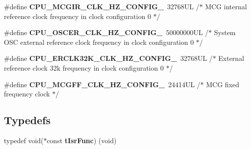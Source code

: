 \begin{DoxyCompactItemize}
\item 
\hypertarget{group___cpu__module_ga860e7441eac7d5e35385bcd62b019d9d}{}\#define {\bfseries C\+P\+U\+\_\+\+M\+C\+G\+I\+R\+\_\+\+C\+L\+K\+\_\+\+H\+Z\+\_\+\+C\+O\+N\+F\+I\+G\+\_}~32768\+U\+L /$\ast$ M\+C\+G internal reference clock frequency in clock configuration 0 $\ast$/\label{group___cpu__module_ga860e7441eac7d5e35385bcd62b019d9d}

\item 
\hypertarget{group___cpu__module_ga2960ebfe6475f475999ea8f1d5448483}{}\#define {\bfseries C\+P\+U\+\_\+\+O\+S\+C\+E\+R\+\_\+\+C\+L\+K\+\_\+\+H\+Z\+\_\+\+C\+O\+N\+F\+I\+G\+\_}~50000000\+U\+L /$\ast$ System O\+S\+C external reference clock frequency in clock configuration 0 $\ast$/\label{group___cpu__module_ga2960ebfe6475f475999ea8f1d5448483}

\item 
\hypertarget{group___cpu__module_ga092702a75fd1041eb311850abb022240}{}\#define {\bfseries C\+P\+U\+\_\+\+E\+R\+C\+L\+K32\+K\+\_\+\+C\+L\+K\+\_\+\+H\+Z\+\_\+\+C\+O\+N\+F\+I\+G\+\_}~32768\+U\+L /$\ast$ External reference clock 32k frequency in clock configuration 0 $\ast$/\label{group___cpu__module_ga092702a75fd1041eb311850abb022240}

\item 
\hypertarget{group___cpu__module_gafd8ec2ac4ea47574f95d0e5a6f80807e}{}\#define {\bfseries C\+P\+U\+\_\+\+M\+C\+G\+F\+F\+\_\+\+C\+L\+K\+\_\+\+H\+Z\+\_\+\+C\+O\+N\+F\+I\+G\+\_}~24414\+U\+L /$\ast$ M\+C\+G fixed frequency clock $\ast$/\label{group___cpu__module_gafd8ec2ac4ea47574f95d0e5a6f80807e}

\end{DoxyCompactItemize}
\subsection*{Typedefs}
\begin{DoxyCompactItemize}
\item 
\hypertarget{group___cpu__module_gafea04d3e8135767c03ce099f02e97437}{}typedef void($\ast$const {\bfseries t\+Isr\+Func}) (void)\label{group___cpu__module_gafea04d3e8135767c03ce099f02e97437}

\end{DoxyCompactItemize}
